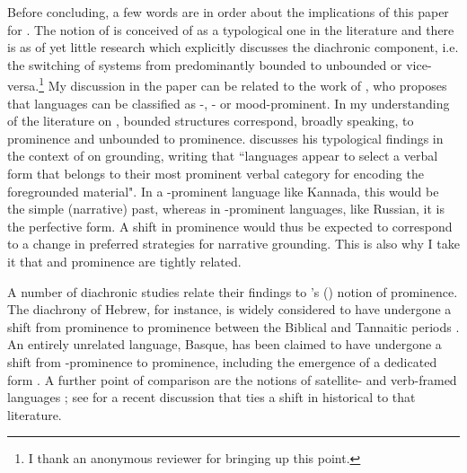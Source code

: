 \documentclass[output=paper,colorlinks,citecolor=brown]{langscibook}
\begin{document}
Before concluding, a few words are in order about the implications of this paper for . The notion of  is conceived of as a typological one in the literature \citep{vonstutterheim2005crosslinguistic, vonstutterheim2003} and there is as of yet little research which explicitly discusses the diachronic component, i.e. the switching of systems from predominantly bounded to unbounded or vice-versa.\footnote{I thank an anonymous reviewer for bringing up this point.} My discussion in the paper can be related to the work of \citet{bhat1999prominence}, who proposes that languages can be classified as -, - or mood-prominent. In my understanding of the literature on  \citep{carroll2003information, carroll2004language, vonstutterheim2003, vonstutterheim2005crosslinguistic, von2002cross}, bounded structures correspond, broadly speaking, to  prominence and unbounded to  prominence. \citet[179]{bhat1999prominence} discusses his typological findings in the context of \citet{hopper1979some} on grounding, writing that ``languages appear to select a verbal form that belongs to their most prominent verbal category for encoding the foregrounded material". In a -prominent language like Kannada, this would be the simple (narrative) past, whereas in -prominent languages, like Russian, it is the perfective form. A shift in prominence would thus be expected to correspond to a change in preferred strategies for narrative grounding. This is also why I take it that  and prominence are tightly related.

A number of diachronic studies relate their findings to \citeauthor{bhat1999prominence}'s (\citeyear{bhat1999prominence}) notion of prominence. The diachrony of Hebrew, for instance, is widely considered to have undergone a shift from  prominence to  prominence between the Biblical and Tannaitic periods \citep[74--81]{penner2015verbal}. An entirely unrelated language, Basque, has been claimed to have undergone a shift from -prominence to  prominence, including the emergence of a dedicated   form \citep{martinez2022latin}. A further point of comparison are the notions of satellite- and verb-framed languages \citep{talmy1985lexicalization}; see \citet{fanego2024english} for a recent discussion that ties a  shift in historical  to that literature.
\end{document}
